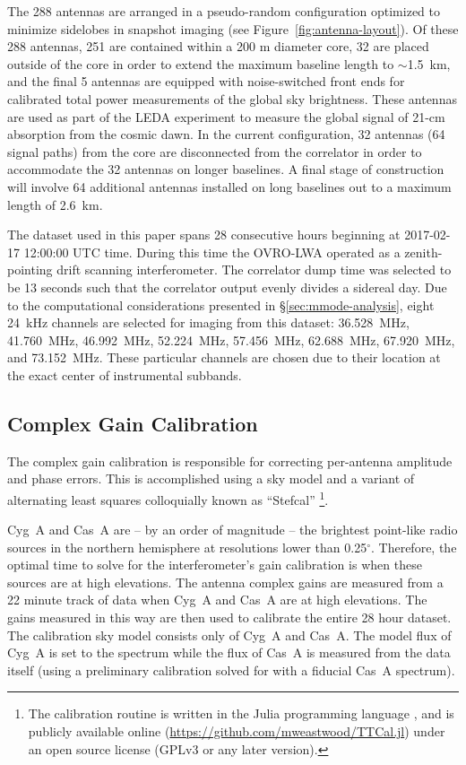 \documentclass[twocolumn]{aastex61}
\begin{document}
The 288 antennas are arranged in a pseudo-random configuration optimized to minimize sidelobes in
snapshot imaging (see Figure~\ref{fig:antenna-layout}).  Of these 288 antennas, 251 are contained
within a 200 m diameter core, 32 are placed outside of the core in order to extend the maximum
baseline length to $\sim$1.5~km, and the final 5 antennas are equipped with noise-switched front
ends for calibrated total power measurements of the global sky brightness.  These antennas are used
as part of the LEDA experiment \citep{2017arXiv170909313P} to measure the global signal of 21-cm
absorption from the cosmic dawn. In the current configuration, 32 antennas (64 signal paths) from
the core are disconnected from the correlator in order to accommodate the 32 antennas on longer
baselines. A final stage of construction will involve 64 additional antennas installed on long
baselines out to a maximum length of 2.6~km.

The dataset used in this paper spans 28 consecutive hours beginning at 2017-02-17 12:00:00 UTC time.
During this time the OVRO-LWA operated as a zenith-pointing drift scanning interferometer.  The
correlator dump time was selected to be 13 seconds such that the correlator output evenly divides a
sidereal day. Due to the computational considerations presented in \S\ref{sec:mmode-analysis}, eight
24~kHz channels are selected for imaging from this dataset: 36.528~MHz, 41.760~MHz, 46.992~MHz,
52.224~MHz, 57.456~MHz, 62.688~MHz, 67.920~MHz, and 73.152~MHz.  These particular channels are
chosen due to their location at the exact center of instrumental subbands.

\subsection{Complex Gain Calibration}\label{sec:gaincal}

The complex gain calibration is responsible for correcting per-antenna amplitude and phase errors.
This is accomplished using a sky model and a variant of alternating least squares colloquially known
as ``Stefcal''
\citep{2008ISTSP...2..707M, 2014A&A...571A..97S}\footnote{
    The calibration routine is written in the Julia programming language
    \citep{doi:10.1137/141000671}, and is publicly available online
    (\url{https://github.com/mweastwood/TTCal.jl}) under an open source license (GPLv3 or any later
    version).
}.

Cyg~A and Cas~A are -- by an order of magnitude -- the brightest point-like radio sources in the
northern hemisphere at resolutions lower than 0.25$^\circ$. Therefore, the optimal time to solve for
the interferometer's gain calibration is when these sources are at high elevations.  The antenna
complex gains are measured from a 22 minute track of data when Cyg~A and Cas~A are at high
elevations. The gains measured in this way are then used to calibrate the entire 28 hour dataset.
The calibration sky model consists only of Cyg~A and Cas~A. The model flux of Cyg~A is set to the
\citet{1977A&A....61...99B} spectrum while the flux of Cas~A is measured from the data itself (using
a preliminary calibration solved for with a fiducial Cas~A spectrum).
\end{document}
